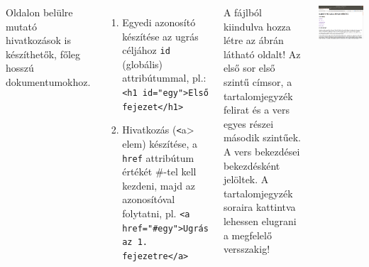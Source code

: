 \documentclass[usenames,dvipsnames,aspectratio=169]{beamer}
\begin{document}
\begin{frame}
  \begin{columns}[c]
    \footnotesize
      Oldalon belülre mutató hivatkozások is készíthetők, főleg hosszú dokumentumokhoz.
      \begin{enumerate}
        \item Egyedi azonosító készítése az ugrás céljához \texttt{id} (globális) attribútummal, pl.: \texttt{<h1 id="egy">Első fejezet</h1>}
        \item Hivatkozás (\texttt<a> elem) készítése, a \texttt{href} attribútum értékét \#-tel kell kezdeni, majd az azonosítóval folytatni, pl. \texttt{<a href="\#egy">Ugrás az 1. fejezetre</a>}
      \end{enumerate}
      \vfill
      A  fájlból kiindulva hozza létre az ábrán látható oldalt! Az első sor első szintű címsor, a tartalomjegyzék felirat és a vers egyes részei második szintűek. A vers bekezdései bekezdésként jelöltek. A tartalomjegyzék soraira kattintva lehessen elugrani a megfelelő versszakig!
      \begin{center}
        \begin{exampleblock}{}
          \centering \includegraphics[scale=.15]{jonas.png}
        \end{exampleblock}
      \end{center}
  \end{columns}
\end{frame}
\end{document}

